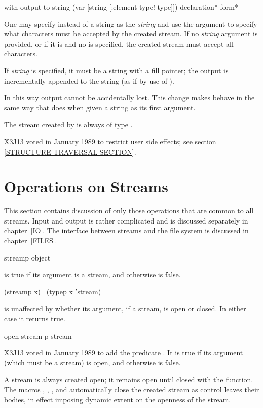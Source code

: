 \begin{defmac}
with-output-to-string (var [string [\!:element-type! type]])
                      {declaration}* {form}*

One may specify  instead of a string as the \emph{string}
and use the  argument to specify what characters
must be accepted by the created stream.  If no \emph{string} argument
is provided, or if it is  and no  is specified,
the created stream must accept all characters.

If \emph{string} is specified, it must be a string with a fill pointer;
the output is incrementally appended to the string (as if by use of
).

In this way output cannot be accidentally lost.  This change makes
 behave in the same way that  does
when given a string as its first argument.

The stream created by
 is always of type .

X3J13 voted in January 1989
to restrict user side effects; see section \ref{STRUCTURE-TRAVERSAL-SECTION}.
\end{defmac}

\section {Operations on Streams}

This section contains discussion of only those operations that
are common to all streams.  Input and output is rather complicated
and is discussed separately in chapter~\ref{IO}.
The interface between streams and the file system is discussed
in chapter~\ref{FILES}.

\begin{defun}[Function]
streamp object

 is true if its argument is a stream,
and otherwise is false.
\begin{lisp}
(streamp x) \EQ\ (typep x 'stream)
\end{lisp}

 is unaffected
by whether its argument, if a stream, is open or closed.  In either case
it returns true.
\end{defun}

\begin{defun}[Function]
open-stream-p stream

X3J13 voted in January 1989 
to add the predicate .
It is true if its argument (which must be a stream)
is open, and otherwise is false.

A stream is always created open; it remains open until closed
with the  function.  The macros ,
, ,
and  automatically close the created stream
as control leaves their bodies, in effect imposing dynamic extent
on the openness of the stream.
\end{defun}

